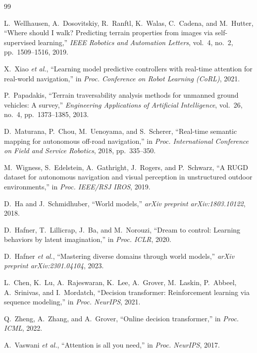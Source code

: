 \documentclass[sensors,article,submit,pdftex,moreauthors]{Definitions/mdpi}
\begin{document}
\begin{thebibliography}{99}

L.~Wellhausen, A.~Dosovitskiy, R.~Ranftl, K.~Walas, C.~Cadena, and M.~Hutter, ``Where should I walk? Predicting terrain properties from images via self-supervised learning,'' \textit{IEEE Robotics and Automation Letters}, vol.~4, no.~2, pp.~1509--1516, 2019.

X.~Xiao \textit{et al.}, ``Learning model predictive controllers with real-time attention for real-world navigation,'' in \textit{Proc. Conference on Robot Learning (CoRL)}, 2021.

P.~Papadakis, ``Terrain traversability analysis methods for unmanned ground vehicles: A survey,'' \textit{Engineering Applications of Artificial Intelligence}, vol.~26, no.~4, pp.~1373--1385, 2013.

D.~Maturana, P.~Chou, M.~Uenoyama, and S.~Scherer, ``Real-time semantic mapping for autonomous off-road navigation,'' in \textit{Proc. International Conference on Field and Service Robotics}, 2018, pp.~335--350.

M.~Wigness, S.~Edelstein, A.~Gathright, J.~Rogers, and P.~Schwarz, ``A RUGD dataset for autonomous navigation and visual perception in unstructured outdoor environments,'' in \textit{Proc. IEEE/RSJ IROS}, 2019.

D.~Ha and J.~Schmidhuber, ``World models,'' \textit{arXiv preprint arXiv:1803.10122}, 2018.

D.~Hafner, T.~Lillicrap, J.~Ba, and M.~Norouzi, ``Dream to control: Learning behaviors by latent imagination,'' in \textit{Proc. ICLR}, 2020.

D.~Hafner \textit{et al.}, ``Mastering diverse domains through world models,'' \textit{arXiv preprint arXiv:2301.04104}, 2023.

L.~Chen, K.~Lu, A.~Rajeswaran, K.~Lee, A.~Grover, M.~Laskin, P.~Abbeel, A.~Srinivas, and I.~Mordatch, ``Decision transformer: Reinforcement learning via sequence modeling,'' in \textit{Proc. NeurIPS}, 2021.

Q.~Zheng, A.~Zhang, and A.~Grover, ``Online decision transformer,'' in \textit{Proc. ICML}, 2022.

A.~Vaswani \textit{et al.}, ``Attention is all you need,'' in \textit{Proc. NeurIPS}, 2017.


\end{thebibliography}
\end{document}
